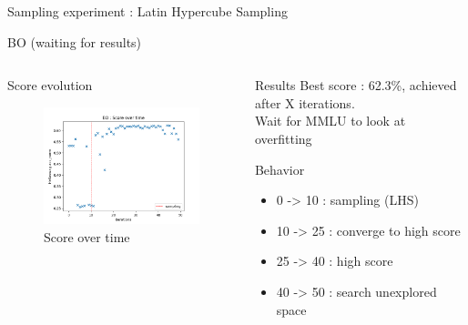 \begin{frame}[allowframebreaks]{Sampling experiment : Latin Hypercube Sampling}
\end{frame}



\begin{frame}[allowframebreaks]{BO (waiting for results)}
    
    \begin{columns}
    
        \begin{column}{0.6\textwidth}
            \begin{block}{Score evolution}
                \begin{figure}
                    \centering
                    \includegraphics[width = 7.5cm]{imgs/plots/exp12_score_over_time.png}
                    \caption{Score over time}
                \end{figure}
            
            \end{block}   
        \end{column}

        \begin{column}{0.4\textwidth}
            \begin{block}{Results}
                Best score : 62.3\%, achieved after X iterations. \\   
                Wait for MMLU to look at overfitting            
            \end{block}

            \begin{block}{Behavior}
                \begin{itemize}
                    \item 0 -> 10 : sampling (LHS)
                    \item 10 -> 25 : converge to high score
                    \item 25 -> 40 : high score
                    \item 40 -> 50 : search unexplored space
                \end{itemize}
                

\end{block}
\end{column}
\end{columns}
\end{frame}
